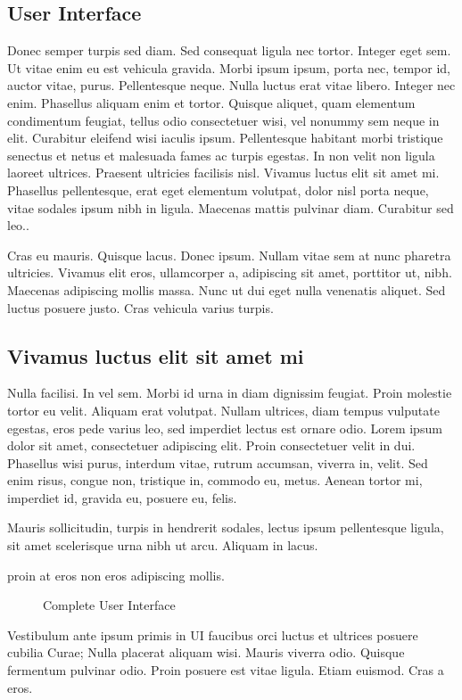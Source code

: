 \subsection{User Interface}
Donec semper turpis sed diam. Sed consequat ligula nec tortor. Integer eget sem. Ut vitae enim eu est vehicula gravida. Morbi ipsum ipsum, porta nec, tempor id, auctor vitae, purus. Pellentesque neque. Nulla luctus erat vitae libero. Integer nec enim. Phasellus aliquam enim et tortor. Quisque aliquet, quam elementum condimentum feugiat, tellus odio consectetuer wisi, vel nonummy sem neque in elit. Curabitur eleifend wisi iaculis ipsum. Pellentesque habitant morbi tristique senectus et netus et malesuada fames ac turpis egestas. In non velit non ligula laoreet ultrices. Praesent ultricies facilisis nisl. Vivamus luctus elit sit amet mi. Phasellus pellentesque, erat eget elementum volutpat, dolor nisl porta neque, vitae sodales ipsum nibh in ligula. Maecenas mattis pulvinar diam. Curabitur sed leo..

Cras eu mauris. Quisque lacus. Donec ipsum. Nullam vitae sem at nunc pharetra ultricies. Vivamus elit eros, ullamcorper a, adipiscing sit amet, porttitor ut, nibh. Maecenas adipiscing mollis massa. Nunc ut dui eget nulla venenatis aliquet. Sed luctus posuere justo. Cras vehicula varius turpis. 
\subsection{Vivamus luctus elit sit amet mi}
Nulla facilisi. In vel sem. Morbi id urna in diam dignissim feugiat. Proin molestie tortor eu velit. Aliquam erat volutpat. Nullam ultrices, diam tempus vulputate egestas, eros pede varius leo, sed imperdiet lectus est ornare odio. Lorem ipsum dolor sit amet, consectetuer adipiscing elit. Proin consectetuer velit in dui. Phasellus wisi purus, interdum vitae, rutrum accumsan, viverra in, velit. Sed enim risus, congue non, tristique in, commodo eu, metus. Aenean tortor mi, imperdiet id, gravida eu, posuere eu, felis. 

Mauris sollicitudin, turpis in hendrerit sodales, lectus ipsum pellentesque ligula, sit amet scelerisque urna nibh ut arcu. Aliquam in lacus. 

 proin at eros non eros adipiscing mollis.

\begin{figure}[htbp]
	\centering
	 \qquad
	\caption{Complete User Interface}
	\label{fig:user_interface}
\end{figure}

Vestibulum ante ipsum primis in \ac{UI} faucibus orci luctus et ultrices posuere cubilia Curae; Nulla placerat aliquam wisi. Mauris viverra odio. Quisque fermentum pulvinar odio. Proin posuere est vitae ligula. Etiam euismod. Cras a eros.